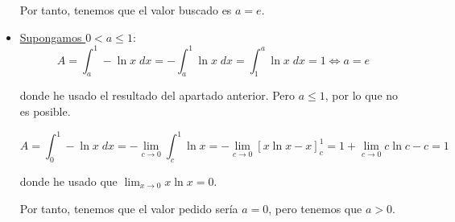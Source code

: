 \documentclass[12pt]{article}
\begin{document}
\begin{ejercicio}
\begin{itemize}
        Por tanto, tenemos que el valor buscado es $a=e$.

        \item \underline{Supongamos $0<a\leq 1$}:
        \begin{equation*}
            A= \int_a^1 -\ln x\;dx
            = -\int_a^1 \ln x\;dx
            = \int_1^a \ln x\;dx=1
            \Longleftrightarrow a=e
        \end{equation*}

        donde he usado el resultado del apartado anterior. Pero $a\leq 1$, por lo que no es posible.
        
        \begin{observacion}
        \begin{equation*}
            A=\int_0^1-\ln x\;dx =-\lim_{c\to 0}\int_c^1 \ln x 
            =-\lim_{c\to 0} \left[x\ln x -x\right]_c^1 = 1+\lim_{c\to 0} c\ln c -c = 1
        \end{equation*}

        donde he usado que $\displaystyle \lim_{x\to 0}x\ln x =0$.

        Por tanto, tenemos que el valor pedido sería $a=0$, pero tenemos que $a>0$.
        \end{observacion}
    \end{itemize}
\end{ejercicio}
\end{document}
